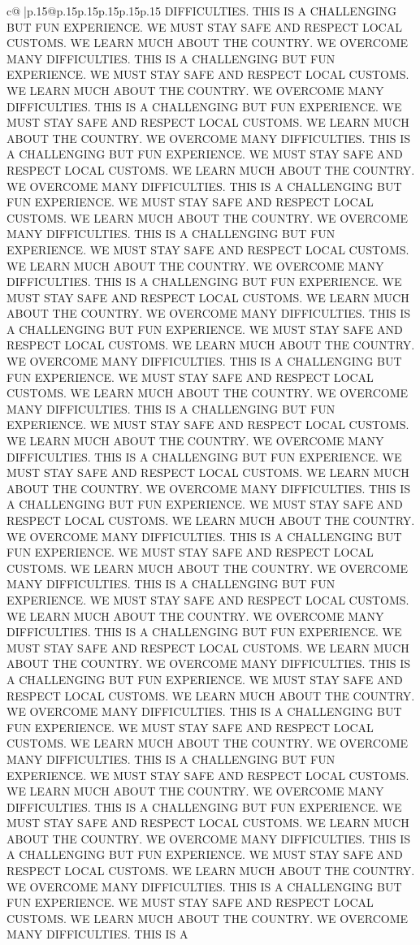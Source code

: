 \documentclass{article}
\begin{document}
{\begin{supertabular}{c@{$\;$}|p{.15\linewidth}@{}p{.15\linewidth}p{.15\linewidth}p{.15\linewidth}p{.15\linewidth}p{.15\linewidth}}
{{{DIFFICULTIES. THIS IS A CHALLENGING BUT FUN EXPERIENCE. WE MUST STAY SAFE AND RESPECT LOCAL CUSTOMS. WE LEARN MUCH ABOUT THE COUNTRY. WE OVERCOME MANY DIFFICULTIES. THIS IS A CHALLENGING BUT FUN EXPERIENCE. WE MUST STAY SAFE AND RESPECT LOCAL CUSTOMS. WE LEARN MUCH ABOUT THE COUNTRY. WE OVERCOME MANY DIFFICULTIES. THIS IS A CHALLENGING BUT FUN EXPERIENCE. WE MUST STAY SAFE AND RESPECT LOCAL CUSTOMS. WE LEARN MUCH ABOUT THE COUNTRY. WE OVERCOME MANY DIFFICULTIES. THIS IS A CHALLENGING BUT FUN EXPERIENCE. WE MUST STAY SAFE AND RESPECT LOCAL CUSTOMS. WE LEARN MUCH ABOUT THE COUNTRY. WE OVERCOME MANY DIFFICULTIES. THIS IS A CHALLENGING BUT FUN EXPERIENCE. WE MUST STAY SAFE AND RESPECT LOCAL CUSTOMS. WE LEARN MUCH ABOUT THE COUNTRY. WE OVERCOME MANY DIFFICULTIES. THIS IS A CHALLENGING BUT FUN EXPERIENCE. WE MUST STAY SAFE AND RESPECT LOCAL CUSTOMS. WE LEARN MUCH ABOUT THE COUNTRY. WE OVERCOME MANY DIFFICULTIES. THIS IS A CHALLENGING BUT FUN EXPERIENCE. WE MUST STAY SAFE AND RESPECT LOCAL CUSTOMS. WE LEARN MUCH ABOUT THE COUNTRY. WE OVERCOME MANY DIFFICULTIES. THIS IS A CHALLENGING BUT FUN EXPERIENCE. WE MUST STAY SAFE AND RESPECT LOCAL CUSTOMS. WE LEARN MUCH ABOUT THE COUNTRY. WE OVERCOME MANY DIFFICULTIES. THIS IS A CHALLENGING BUT FUN EXPERIENCE. WE MUST STAY SAFE AND RESPECT LOCAL CUSTOMS. WE LEARN MUCH ABOUT THE COUNTRY. WE OVERCOME MANY DIFFICULTIES. THIS IS A CHALLENGING BUT FUN EXPERIENCE. WE MUST STAY SAFE AND RESPECT LOCAL CUSTOMS. WE LEARN MUCH ABOUT THE COUNTRY. WE OVERCOME MANY DIFFICULTIES. THIS IS A CHALLENGING BUT FUN EXPERIENCE. WE MUST STAY SAFE AND RESPECT LOCAL CUSTOMS. WE LEARN MUCH ABOUT THE COUNTRY. WE OVERCOME MANY DIFFICULTIES. THIS IS A CHALLENGING BUT FUN EXPERIENCE. WE MUST STAY SAFE AND RESPECT LOCAL CUSTOMS. WE LEARN MUCH ABOUT THE COUNTRY. WE OVERCOME MANY DIFFICULTIES. THIS IS A CHALLENGING BUT FUN EXPERIENCE. WE MUST STAY SAFE AND RESPECT LOCAL CUSTOMS. WE LEARN MUCH ABOUT THE COUNTRY. WE OVERCOME MANY DIFFICULTIES. THIS IS A CHALLENGING BUT FUN EXPERIENCE. WE MUST STAY SAFE AND RESPECT LOCAL CUSTOMS. WE LEARN MUCH ABOUT THE COUNTRY. WE OVERCOME MANY DIFFICULTIES. THIS IS A CHALLENGING BUT FUN EXPERIENCE. WE MUST STAY SAFE AND RESPECT LOCAL CUSTOMS. WE LEARN MUCH ABOUT THE COUNTRY. WE OVERCOME MANY DIFFICULTIES. THIS IS A CHALLENGING BUT FUN EXPERIENCE. WE MUST STAY SAFE AND RESPECT LOCAL CUSTOMS. WE LEARN MUCH ABOUT THE COUNTRY. WE OVERCOME MANY DIFFICULTIES. THIS IS A CHALLENGING BUT FUN EXPERIENCE. WE MUST STAY SAFE AND RESPECT LOCAL CUSTOMS. WE LEARN MUCH ABOUT THE COUNTRY. WE OVERCOME MANY DIFFICULTIES. THIS IS A CHALLENGING BUT FUN EXPERIENCE. WE MUST STAY SAFE AND RESPECT LOCAL CUSTOMS. WE LEARN MUCH ABOUT THE COUNTRY. WE OVERCOME MANY DIFFICULTIES. THIS IS A CHALLENGING BUT FUN EXPERIENCE. WE MUST STAY SAFE AND RESPECT LOCAL CUSTOMS. WE LEARN MUCH ABOUT THE COUNTRY. WE OVERCOME MANY DIFFICULTIES. THIS IS A CHALLENGING BUT FUN EXPERIENCE. WE MUST STAY SAFE AND RESPECT LOCAL CUSTOMS. WE LEARN MUCH ABOUT THE COUNTRY. WE OVERCOME MANY DIFFICULTIES. THIS IS A CHALLENGING BUT FUN EXPERIENCE. WE MUST STAY SAFE AND RESPECT LOCAL CUSTOMS. WE LEARN MUCH ABOUT THE COUNTRY. WE OVERCOME MANY DIFFICULTIES. THIS IS A }}}
\end{supertabular}}
\end{document}
